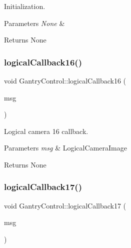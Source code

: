 Initialization. 


\begin{DoxyParams}{Parameters}
{\em None} & \\
\hline
\end{DoxyParams}
\begin{DoxyReturn}{Returns}
None 
\end{DoxyReturn}
\mbox{\label{classGantryControl_a9206feae49953cf691e0dec2331cc3ae}} 
\subsubsection{\texorpdfstring{logical\+Callback16()}{logicalCallback16()}}
{\footnotesize\ttfamily void Gantry\+Control\+::logical\+Callback16 (\begin{DoxyParamCaption}\item[{const nist\+\_\+gear\+::\+Logical\+Camera\+Image \&}]{msg }\end{DoxyParamCaption})}



Logical camera 16 callback. 


\begin{DoxyParams}{Parameters}
{\em msg} & Logical\+Camera\+Image \\
\hline
\end{DoxyParams}
\begin{DoxyReturn}{Returns}
None 
\end{DoxyReturn}
\mbox{\label{classGantryControl_a9d745504ec1dbcc8549f5a604f34bbcc}} 
\subsubsection{\texorpdfstring{logical\+Callback17()}{logicalCallback17()}}
{\footnotesize\ttfamily void Gantry\+Control\+::logical\+Callback17 (\begin{DoxyParamCaption}\item[{const nist\+\_\+gear\+::\+Logical\+Camera\+Image \&}]{msg }\end{DoxyParamCaption})}




